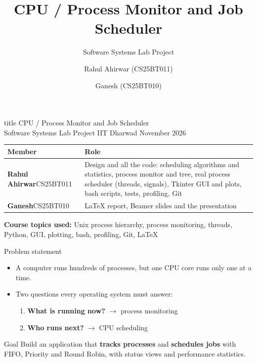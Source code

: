 \documentclass[aspectratio=169,11pt]{beamer}
\title[Process Monitor \& Job Scheduler]{CPU / Process Monitor and Job Scheduler}
\subtitle{Software Systems Lab Project}
\author[Rahul, Ganesh]{Rahul Ahirwar (CS25BT011) \and Ganesh (CS25BT010)}
\begin{document}
\begin{frame}
  \centering
  \begin{beamercolorbox}[sep=10pt,center,rounded=true,shadow=true]{title}
    {\Large CPU / Process Monitor and Job Scheduler}\\[3pt]
    {\small Software Systems Lab Project \textbullet{} IIT Dharwad \textbullet{} November 2026}
  \end{beamercolorbox}
  \vspace{0.5cm}

  \begin{tabular}{p{}p{}}
    \toprule
    \textbf{Member} & \textbf{Role} \\
    \midrule
    \textbf{Rahul Ahirwar}\newline CS25BT011 &
      Design and all the code: scheduling algorithms and statistics,
      process monitor and tree, real process scheduler (threads, signals),
      Tkinter GUI and plots, bash scripts, tests, profiling, Git \\[6pt]
    \textbf{Ganesh}\newline CS25BT010 &
      \LaTeX{} report, Beamer slides and the presentation \\
    \bottomrule
  \end{tabular}
  \vspace{0.4cm}

  \small \textbf{Course topics used:} Unix process hierarchy, process monitoring, threads,
  Python, GUI, plotting, bash, profiling, Git, \LaTeX
\end{frame}

\begin{frame}{Problem statement}
  \begin{itemize}
    \item A computer runs hundreds of processes, but one CPU core runs only one at a time.
    \item Two questions every operating system must answer:
      \begin{enumerate}
        \item \textbf{What is running now?} \(\rightarrow\) process monitoring
        \item \textbf{Who runs next?} \(\rightarrow\) CPU scheduling
      \end{enumerate}
  \end{itemize}
  \vspace{0.3cm}
  \begin{block}{Goal}
    Build an application that \textbf{tracks processes} and \textbf{schedules jobs}
    with FIFO, Priority and Round Robin, with status views and performance statistics.
  \end{block}
\end{frame}
\end{document}
